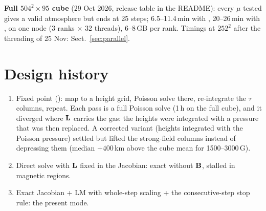 \textbf{Full $504^2\times95$ cube} (29 Oct 2026, release table in the README): every $\mu$ tested gives a valid atmosphere but ends
 at 25 steps; 6.5--11.4\,min with , 20--26\,min with , on one node (3 ranks $\times$ 32
threads), 6--8\,GB per rank. Timings at $252^2$ after the threading of 25 Nov: Sect.~\ref{sec:parallel}.

\section{Design history}
\begin{enumerate}
\item Fixed point (): map to a height grid, Poisson solve there, re-integrate the
$\tau$ columns, repeat. Each pass is a full Poisson solve (1\,h on the full cube), and it diverged where $\mathbf L$ carries the
gas: the heights were integrated with a pressure that was then replaced. A corrected variant (heights integrated with the Poisson
pressure) settled but lifted the strong-field columns instead of depressing them (median $+400$\,km above the cube mean for
1500--3000\,G).
\item Direct solve with $\mathbf L$ fixed in the Jacobian: exact without $\mathbf B$, stalled in magnetic regions.
\item Exact Jacobian + LM with whole-step scaling + the consecutive-step stop rule: the present mode.
\end{enumerate}

